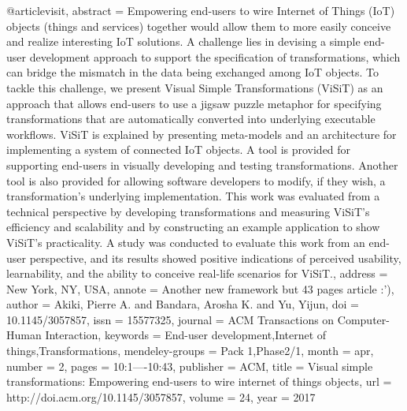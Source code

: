 @article{visit,
    abstract = {Empowering end-users to wire Internet of Things (IoT) objects (things and services) together would allow them to more easily conceive and realize interesting IoT solutions. A challenge lies in devising a simple end-user development approach to support the specification of transformations, which can bridge the mismatch in the data being exchanged among IoT objects. To tackle this challenge, we present Visual Simple Transformations (ViSiT) as an approach that allows end-users to use a jigsaw puzzle metaphor for specifying transformations that are automatically converted into underlying executable workflows. ViSiT is explained by presenting meta-models and an architecture for implementing a system of connected IoT objects. A tool is provided for supporting end-users in visually developing and testing transformations. Another tool is also provided for allowing software developers to modify, if they wish, a transformation's underlying implementation. This work was evaluated from a technical perspective by developing transformations and measuring ViSiT's efficiency and scalability and by constructing an example application to show ViSiT's practicality. A study was conducted to evaluate this work from an end-user perspective, and its results showed positive indications of perceived usability, learnability, and the ability to conceive real-life scenarios for ViSiT.},
    address = {New York, NY, USA},
    annote = {Another new framework but 43 pages article :')},
    author = {Akiki, Pierre A. and Bandara, Arosha K. and Yu, Yijun},
    doi = {10.1145/3057857},
    issn = {15577325},
    journal = {ACM Transactions on Computer-Human Interaction},
    keywords = {End-user development,Internet of things,Transformations},
    mendeley-groups = {Pack 1,Phase2/1},
    month = {apr},
    number = {2},
    pages = {10:1----10:43},
    publisher = {ACM},
    title = {{Visual simple transformations: Empowering end-users to wire internet of things objects}},
    url = {http://doi.acm.org/10.1145/3057857},
    volume = {24},
    year = {2017}
}

